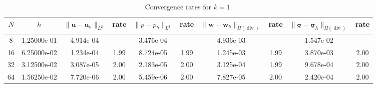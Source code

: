 \begin{table}[ht!]
\centering
\begin{tabular}{c c c c c c c c c c}
\hline
$N$ & $h$ & $\|\mathbf{u}-\mathbf{u}_h\|_{L^2}$ & rate & $\|p-p_h\|_{L^2}$ & rate & $\|\mathbf{w}-\mathbf{w}_h\|_{H(\operatorname{div})}$ & rate & $\|\underline{\boldsymbol{\sigma}}-\underline{\boldsymbol{\sigma}}_h\|_{H(\operatorname{div})}$ & rate \\
\hline
8 & 1.25000e-01 & 4.914e-04 & - & 3.476e-04 & - & 4.936e-03 & - & 1.547e-02 & - \\
16 & 6.25000e-02 & 1.234e-04 & 1.99 & 8.724e-05 & 1.99 & 1.245e-03 & 1.99 & 3.870e-03 & 2.00 \\
32 & 3.12500e-02 & 3.087e-05 & 2.00 & 2.183e-05 & 2.00 & 3.125e-04 & 1.99 & 9.678e-04 & 2.00 \\
64 & 1.56250e-02 & 7.720e-06 & 2.00 & 5.459e-06 & 2.00 & 7.827e-05 & 2.00 & 2.420e-04 & 2.00 \\
\hline
\end{tabular}
\caption{Convergence rates for $k=1$.}
\label{tab:biot_convergence_single_k1}
\end{table}
